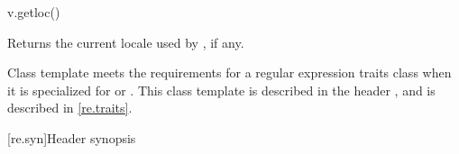 \begin{itemdecl}
v.getloc()
\end{itemdecl}

\begin{itemdescr}
\pnum
\result
{}

\pnum
\returns
Returns the current locale used by , if any. %
\end{itemdescr}

\pnum
\begin{note}
Class template  meets the requirements for a
regular expression traits class when it is specialized for
 or .  This class template is described in
the header , and is described in \ref{re.traits}.
\end{note}

[re.syn]{Header  synopsis}

